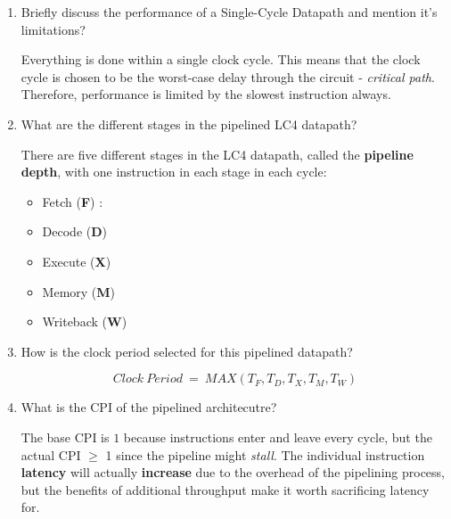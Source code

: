 \documentclass[12pt]{article}
\newenvironment{QandA}{\begin{enumerate}[label=\bfseries\alph*.]\bfseries}
                      {\end{enumerate}}
\newenvironment{answered}{\par\quad\normalfont}{}
\begin{document}
\begin{QandA}
\begin{answered}
    Here $\frac{Instruction}{Program}$ refers to the \textbf{Dynamic Instruction Count}. It is the instructions that the processor will actually run during the course of a program and not just the static instructions (eg: loops).
    \end{answered}
    
    \item Briefly discuss the performance of a Single-Cycle Datapath and mention it's limitations?
    \begin{answered}
    Everything is done within a single clock cycle. This means that the clock cycle is chosen to be the worst-case delay through the circuit - \textit{critical path}. Therefore, performance is limited by the slowest instruction always.
    \end{answered}
        
    \item What are the different stages in the pipelined LC4 datapath?
    \begin{answered}
    There are five different stages in the LC4 datapath, called the \textbf{pipeline depth}, with one instruction in each stage in each cycle:
    \begin{itemize}
        \item Fetch (\textbf{F}) : 
        \item Decode (\textbf{D})
        \item Execute (\textbf{X})
        \item Memory (\textbf{M})
        \item Writeback (\textbf{W})
    \end{itemize}
    \end{answered}
    
    \item How is the clock period selected for this pipelined datapath?
    \begin{answered}
    \begin{equation*}
        Clock\ Period\ =\ MAX(T_{F}, T_{D}, T_{X}, T_{M}, T_{W})
    \end{equation*}    
    \end{answered}
    
    \item What is the CPI of the pipelined architecutre?
    \begin{answered}
    The base CPI is $1$ because instructions enter and leave every cycle, but the actual CPI $\geq$ 1 since the pipeline might \textit{stall}. The individual instruction \textbf{latency} will actually \textbf{increase} due to the overhead of the pipelining process, but the benefits of additional throughput make it worth sacrificing latency for.
    \end{answered}
    

\end{QandA}
\end{document}
